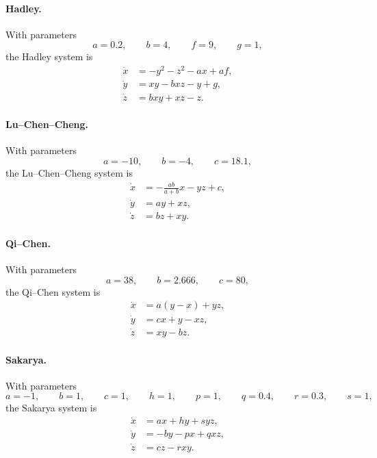 \paragraph{Hadley.}
With parameters
\[
  a=0.2,\qquad b=4,\qquad f=9,\qquad g=1,
\]
the Hadley system is
\begin{equation}
\begin{aligned}
  \dot x &= -y^2-z^2-ax+af,\\
  \dot y &= xy-bxz-y+g,\\
  \dot z &= bxy+xz-z .
\end{aligned}
\label{eq:app_dysts_hadley}
\end{equation}

\paragraph{Lu--Chen--Cheng.}
With parameters
\[
  a=-10,\qquad b=-4,\qquad c=18.1,
\]
the Lu--Chen--Cheng system is
\begin{equation}
\begin{aligned}
  \dot x &= -\frac{ab}{a+b}x-yz+c,\\
  \dot y &= ay+xz,\\
  \dot z &= bz+xy .
\end{aligned}
\label{eq:app_dysts_lu_chen_cheng}
\end{equation}

\paragraph{Qi--Chen.}
With parameters
\[
  a=38,\qquad b=2.666,\qquad c=80,
\]
the Qi--Chen system is
\begin{equation}
\begin{aligned}
  \dot x &= a(y-x)+yz,\\
  \dot y &= cx+y-xz,\\
  \dot z &= xy-bz .
\end{aligned}
\label{eq:app_dysts_qi_chen}
\end{equation}

\paragraph{Sakarya.}
With parameters
\[
  a=-1,\qquad b=1,\qquad c=1,\qquad h=1,\qquad
  p=1,\qquad q=0.4,\qquad r=0.3,\qquad s=1,
\]
the Sakarya system is
\begin{equation}
\begin{aligned}
  \dot x &= ax+hy+syz,\\
  \dot y &= -by-px+qxz,\\
  \dot z &= cz-rxy .
\end{aligned}
\label{eq:app_dysts_sakarya}
\end{equation}

